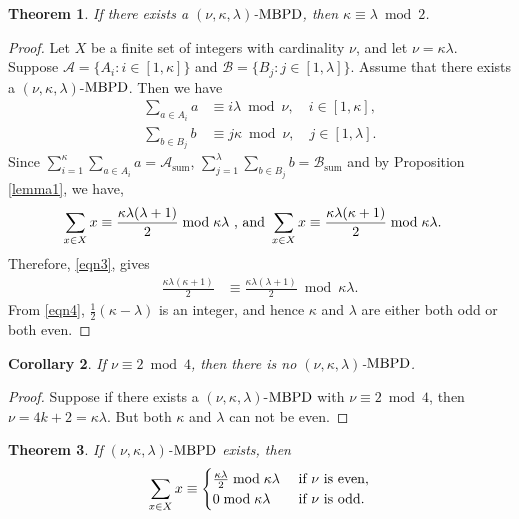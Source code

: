 \documentclass[preprint,11pt]{elsarticle}
\newcommand{\MBPD}{\textnormal{MBPD}}
\newtheorem{theorem}{Theorem}[section]
\newtheorem{corollary}[theorem]{Corollary}
\begin{document}
\begin{theorem}{\label{thmnew}}
    If there exists a $(\nu, \kappa, \lambda)$-$\MBPD$, then $\kappa\equiv \lambda \bmod{2}$.
\end{theorem}
\begin{proof}
 Let $X$ be a finite set of integers with cardinality $\nu$, and let $\nu=\kappa \lambda$. Suppose \(\mathcal{A}=\{A_i: i \in [1,\kappa]\}\) and \(\mathcal{B}=\{B_j: j \in [1,\lambda]\}\).  Assume that there exists a $(\nu, \kappa, \lambda)$-$\MBPD$. Then we have \begin{align}
     \sum_{a\in A_i} a & \equiv i \lambda \bmod{\nu}, \quad i \in [1, \kappa],\\
     \sum_{b\in B_j} b & \equiv j \kappa \bmod{\nu}, \quad j \in [1, \lambda].
 \end{align}
      Since $\sum_{i=1}^{\kappa}\sum_{a\in A_i} a = \mathcal{A}_{\mathrm{sum}}$, $\sum_{j=1}^{\lambda}\sum_{b\in B_j} b= \mathcal{B}_{\mathrm{sum}}$ and by  Proposition \ref{lemma1}, we have, 
      \begin{align}\label{eqn3}
         \sum_{x\in X}x & \equiv \frac{\kappa\lambda(\lambda+1)}{2}\bmod{\kappa\lambda} \textnormal{~,~and~}  \sum_{x\in X}x \equiv \frac{\kappa\lambda(\kappa+1)}{2}\bmod{\kappa\lambda}. 
      \end{align} 
Therefore, \eqref{eqn3}, gives  \begin{align}\label{eqn4}
    \frac{\kappa\lambda(\kappa+1)}{2} & \equiv \frac{\kappa\lambda(\lambda+1)}{2}\bmod{\kappa\lambda}. 
\end{align}
From \eqref{eqn4}, $\frac{1}{2}(\kappa-\lambda)$ is an integer, and hence $\kappa$ and $\lambda$ are either both odd or both even.
\end{proof}
 \begin{corollary}\label{c} If $\nu \equiv 2 \bmod{4}$, then there is no $(\nu, \kappa, \lambda)$-$\MBPD$.
\end{corollary}
 \begin{proof}
   Suppose if there exists a $(\nu, \kappa, \lambda)$-$\MBPD$ with $\nu \equiv 2 \bmod{4}$, then $\nu=4k+2=\kappa\lambda$. But both $\kappa$ and  $\lambda$ can not be even. \end{proof}
\begin{theorem}{\label{x}}
    If $(\nu, \kappa, \lambda)$-$\MBPD$ exists, then\[\sum_{x\in X}x\equiv \begin{cases}
        \frac{\kappa\lambda}{2}\bmod{\kappa\lambda} & \textnormal{~if~} \nu \textnormal{~is even},\\
        0\bmod{\kappa\lambda} & \textnormal{~if~} \nu \textnormal{~is odd}.
    \end{cases}\]
\end{theorem}
\end{document}
